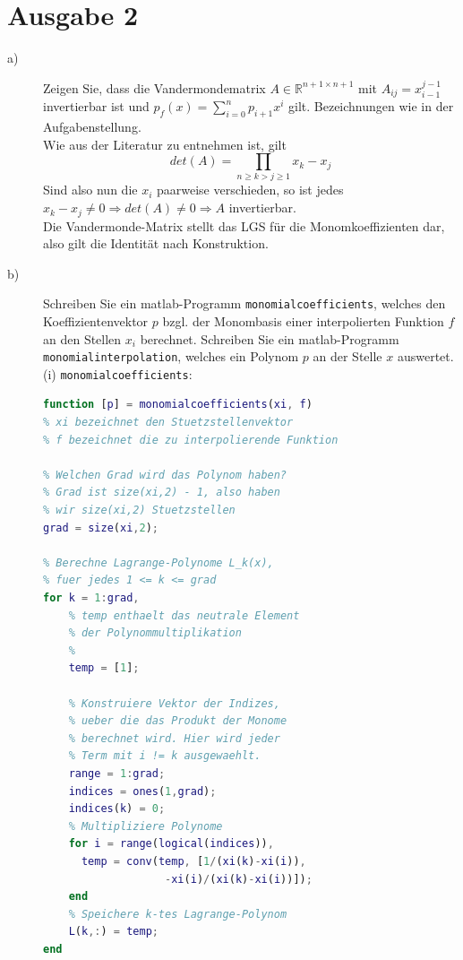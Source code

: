 \documentclass[11pt,a4paper,ngerman]{article}
\begin{document}

\section*{Ausgabe 2}

\begin{description}
\item[a)] Zeigen Sie, dass die Vandermondematrix $A \in \mathbb{R}^{n+1 \times n+1}$ mit $A_{ij} = x_{i-1}^{j-1}$ invertierbar ist und $p_f(x) = \sum_{i=0}^{n}{p_{i+1}x^i}$ gilt. Bezeichnungen wie in der Aufgabenstellung. \\

Wie aus der Literatur zu entnehmen ist, gilt
$$ det(A) = \prod_{n\geq k > j \geq 1}{x_k - x_j} $$
Sind also nun die $x_i$ paarweise verschieden, so ist jedes $x_k - x_j \neq 0 \Rightarrow det(A) \neq 0 \Rightarrow A$ invertierbar. \\

Die Vandermonde-Matrix stellt das LGS für die Monomkoeffizienten dar, also gilt die Identität nach Konstruktion.



\item[b)] Schreiben Sie ein matlab-Programm \texttt{monomialcoefficients}, welches den Koeffizientenvektor $p$ bzgl. der Monombasis einer interpolierten Funktion $f$ an den Stellen $x_i$ berechnet. Schreiben Sie ein matlab-Programm \texttt{monomialinterpolation}, welches ein Polynom $p$ an der Stelle $x$ auswertet.\\

(i) \texttt{monomialcoefficients}:

\begin{lstlisting}[language=matlab]
function [p] = monomialcoefficients(xi, f)
% xi bezeichnet den Stuetzstellenvektor
% f bezeichnet die zu interpolierende Funktion

% Welchen Grad wird das Polynom haben?
% Grad ist size(xi,2) - 1, also haben
% wir size(xi,2) Stuetzstellen
grad = size(xi,2);

% Berechne Lagrange-Polynome L_k(x),
% fuer jedes 1 <= k <= grad
for k = 1:grad,
    % temp enthaelt das neutrale Element
    % der Polynommultiplikation
    % 
    temp = [1];
  
    % Konstruiere Vektor der Indizes,
    % ueber die das Produkt der Monome
    % berechnet wird. Hier wird jeder
    % Term mit i != k ausgewaehlt.
    range = 1:grad;
    indices = ones(1,grad);
    indices(k) = 0;
    % Multipliziere Polynome
    for i = range(logical(indices)),
      temp = conv(temp, [1/(xi(k)-xi(i)),
                   -xi(i)/(xi(k)-xi(i))]);
    end
    % Speichere k-tes Lagrange-Polynom
    L(k,:) = temp;
end


\end{lstlisting}
\end{description}
\end{document}
